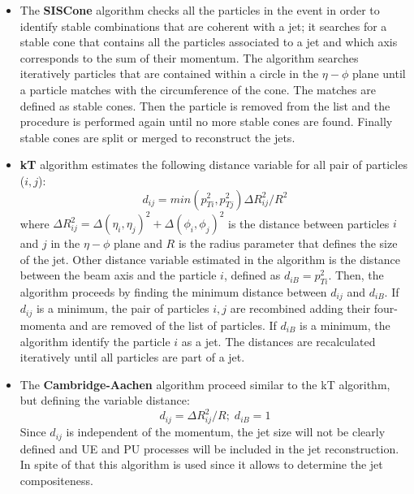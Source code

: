 \begin{itemize}
 \item The \textbf{SISCone} algorithm \cite{Salam:2007xv} checks all the particles in the event in order to identify stable combinations
 that are coherent with a jet; it searches for a stable cone that contains all the particles associated to a jet and 
 which axis corresponds to the sum of their momentum. The algorithm searches iteratively particles that are 
 contained within a circle in the $\eta-\phi$ plane until a particle matches with the 
 circumference of the cone. The matches are defined as stable cones. Then the particle is removed from 
 the list and the procedure is performed again until no more stable cones are found. Finally stable cones are split or merged
 to reconstruct the jets.

 \item \textbf{kT} algorithm \cite{Ellis:1993tq} estimates the following distance variable for all pair of particles ($i,j$):
 \begin{equation}
  \label{eq:kt}
   d_{ij}=min(p_{Ti}^{2},p_{Tj}^{2})\Delta R_{ij}^{2}/R^{2} 
  \end{equation}
where $\Delta R_{ij}^{2}=\Delta(\eta_{i},\eta_{j})^{2}+\Delta(\phi_{i},\phi_{j})^{2}$ is the distance between particles $i$ and $j$
in the $\eta-\phi$ plane and $R$ is the radius parameter that defines the size of the jet. Other distance variable estimated
in the algorithm is the distance between the beam axis and the particle $i$, defined as $d_{iB}=p_{Ti}^{2}$. Then, the algorithm
proceeds by finding the minimum distance between $d_{ij}$ and $d_{iB}$. If $d_{ij}$ is a minimum, the pair of particles $i,j$ 
are recombined adding their four-momenta and are removed of the list of particles. If $d_{iB}$ is a minimum, the algorithm
identify the particle $i$ as a jet. The distances are recalculated iteratively until all particles are part of a jet.
 
 \item The \textbf{Cambridge-Aachen} algorithm \cite{Atkin:2015msa} proceed similar to the kT algorithm, but defining the variable distance:
 \begin{equation}
  \label{eq:antikt}
  d_{ij}=\Delta R_{ij}^{2}/R;\; d_{iB}=1
 \end{equation}
 Since $d_{ij}$ is independent of the momentum, the jet size will not be clearly defined and UE and PU processes will be included in the jet reconstruction.
 In spite of that this algorithm is used since it allows to determine the jet compositeness.
 

\end{itemize}

